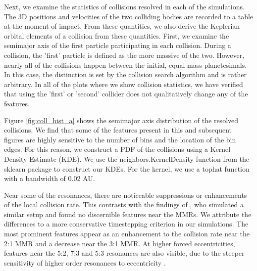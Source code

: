 \documentclass[onecolumn]{aastex63}
\begin{document}
Next, we examine the statistics of collisions resolved in each of the simulations. The 3D positions and velocities of the two colliding bodies are recorded to a table at the moment of impact. From these quantities, we also derive the Keplerian orbital elements of a collision from these quantities. First, we examine the semimajor axis of the first particle participating in each collision. During a collision, the 'first' particle is defined as the more massive of the two. However, nearly all of the collisions happen between the initial, equal-mass planetesimals. In this case, the distinction is set by the collision search algorithm and is rather arbitrary. In all of the plots where we show collision statistics, we have verified that using the 'first' or 'second' collider does not qualitatively change any of the features.

Figure \ref{fig:coll_hist_a} shows the semimajor axis distribution of the resolved collisions. We find that some of the features present in this and subsequent figures are highly sensitive to the number of bins and the location of the bin edges. For this reason, we construct a PDF of the collisions using a Kernel Density Estimate (KDE). We use the {\sc neighbors.KernelDensity} function from the {\sc sklearn} \citep{scikit-learn} package to construct our KDEs. For the kernel, we use a tophat function with a bandwidth of 0.02 AU.

Near some of the resonances, there are noticeable suppressions or enhancements of the local collision rate. This contrasts with the findings of \citet{2000Icar..143...45R}, who simulated a similar setup and found no discernible features near the MMRs. We attribute the differences to  a more conservative timestepping criterion in our simulations. The most prominent features appear as an enhancement to the collision rate near the 2:1 MMR and a decrease near the 3:1 MMR. At higher forced eccentricities, features near the 5:2, 7:3 and 5:3 resonances are also visible, due to the steeper sensitivity of higher order resonances to eccentricity \citep{1994PhyD...77..289M}.
\end{document}
